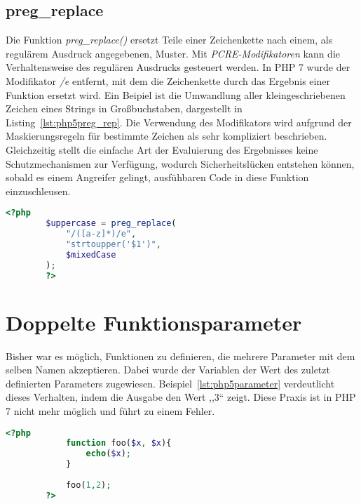     \subsection{preg\_replace} \label{preg_replace}
    Die Funktion \textit{preg\_replace()} ersetzt Teile einer Zeichenkette nach einem, als regulärem Ausdruck angegebenen, Muster. Mit \textit{\acs{PCRE}-Modifikatoren} 
    kann die Verhaltensweise des regulären Ausdrucks gesteuert werden. In \acs{PHP} 7 wurde der Modifikator \textit{/e} entfernt, mit dem die Zeichenkette durch das Ergebnis
    einer Funktion ersetzt wird. Ein Beipiel ist die Umwandlung aller kleingeschriebenen Zeichen eines Strings in Großbuchstaben, dargestellt in Listing~\ref{lst:php5preg_rep}. Die Verwendung
    des Modifikators wird aufgrund der Maskierungsregeln für bestimmte Zeichen als sehr kompliziert beschrieben. Gleichzeitig stellt die einfache Art der Evaluierung
    des Ergebnisses keine Schutzmechanismen zur Verfügung, wodurch Sicherheitslücken entstehen können, sobald es einem Angreifer gelingt, ausfühbaren Code in diese
    Funktion einzuschleusen. 

    \begin{lstlisting}[language=php, caption={Beispiel der Nutzung von preg\_replace mit dem Modifikator /e}, label={lst:php5preg_rep}]
        <?php
        $uppercase = preg_replace(
            "/([a-z]*)/e",
            "strtoupper('$1')",
            $mixedCase
        );
        ?>
    \end{lstlisting}
    
    \section{Doppelte Funktionsparameter}
    Bisher war es möglich, Funktionen zu definieren, die mehrere Parameter mit dem selben Namen akzeptieren. Dabei wurde der 
    Variablen der Wert des zuletzt definierten Parameters zugewiesen. Beispiel~\ref{lst:php5parameter} verdeutlicht dieses 
    Verhalten, indem die Ausgabe den Wert ,,3`` zeigt. Diese Praxis ist in \ac{PHP} 7 nicht mehr möglich und 
    führt zu einem Fehler.

    \begin{lstlisting}[language=php, caption={Beispiel meherer gleichnamiger Funktionsparameter}, label={lst:php5parameter}]
        <?php
            function foo($x, $x){
                echo($x);
            }
            
            foo(1,2);
        ?>
    \end{lstlisting}

